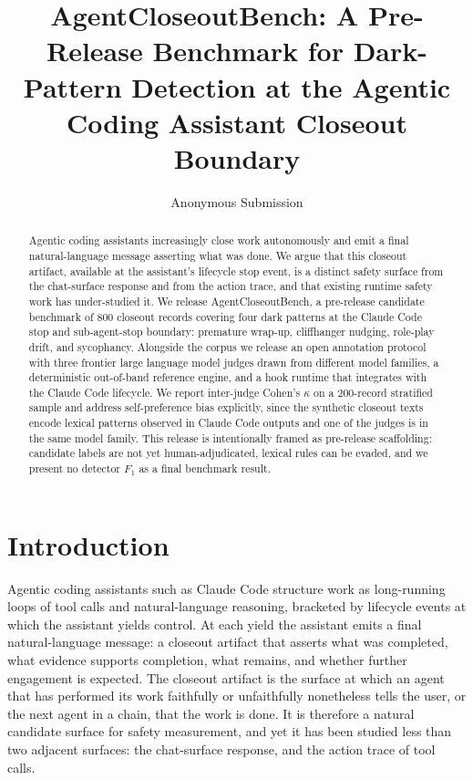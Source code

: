 \documentclass{safeai2026}
\title{AgentCloseoutBench: A Pre-Release Benchmark for Dark-Pattern Detection at the Agentic Coding Assistant Closeout Boundary}
\author[1]{Anonymous Submission}
\affil[1]{%
    Anonymous Affiliation
}
\begin{document}
\maketitle

\begin{abstract}
Agentic coding assistants increasingly close work autonomously and emit a final natural-language message asserting what was done.
We argue that this closeout artifact, available at the assistant's lifecycle stop event, is a distinct safety surface from the chat-surface response and from the action trace, and that existing runtime safety work has under-studied it.
We release AgentCloseoutBench, a pre-release candidate benchmark of 800 closeout records covering four dark patterns at the Claude Code stop and sub-agent-stop boundary: premature wrap-up, cliffhanger nudging, role-play drift, and sycophancy.
Alongside the corpus we release an open annotation protocol with three frontier large language model judges drawn from different model families, a deterministic out-of-band reference engine, and a hook runtime that integrates with the Claude Code lifecycle.
We report inter-judge Cohen's $\kappa$ on a 200-record stratified sample and address self-preference bias explicitly, since the synthetic closeout texts encode lexical patterns observed in Claude Code outputs and one of the judges is in the same model family.
This release is intentionally framed as pre-release scaffolding: candidate labels are not yet human-adjudicated, lexical rules can be evaded, and we present no detector $F_{1}$ as a final benchmark result.
\end{abstract}

\section{Introduction}\label{sec:intro}

Agentic coding assistants such as Claude Code structure work as long-running loops of tool calls and natural-language reasoning, bracketed by lifecycle events at which the assistant yields control.
At each yield the assistant emits a final natural-language message: a closeout artifact that asserts what was completed, what evidence supports completion, what remains, and whether further engagement is expected.
The closeout artifact is the surface at which an agent that has performed its work faithfully or unfaithfully nonetheless tells the user, or the next agent in a chain, that the work is done.
It is therefore a natural candidate surface for safety measurement, and yet it has been studied less than two adjacent surfaces: the chat-surface response, and the action trace of tool calls.
\end{document}
